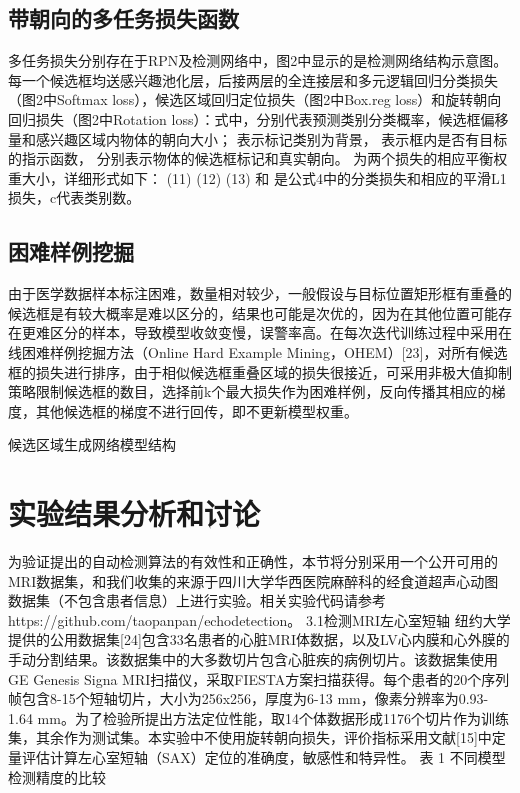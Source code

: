 \subsection{带朝向的多任务损失函数}
多任务损失分别存在于RPN及检测网络中，图2中显示的是检测网络结构示意图。每一个候选框均送感兴趣池化层，后接两层的全连接层和多元逻辑回归分类损失（图2中Softmax loss），候选区域回归定位损失（图2中Box.reg loss）和旋转朝向回归损失（图2中Rotation loss）：式中，分别代表预测类别分类概率，候选框偏移量和感兴趣区域内物体的朝向大小； 表示标记类别为背景， 表示框内是否有目标的指示函数， 分别表示物体的候选框标记和真实朝向。 为两个损失的相应平衡权重大小，详细形式如下：
   	       								      (11)
  									(12)
 								 	(13)
 和 是公式4中的分类损失和相应的平滑L1损失，c代表类别数。
\subsection{困难样例挖掘}
由于医学数据样本标注困难，数量相对较少，一般假设与目标位置矩形框有重叠的候选框是有较大概率是难以区分的，结果也可能是次优的，因为在其他位置可能存在更难区分的样本，导致模型收敛变慢，误警率高。在每次迭代训练过程中采用在线困难样例挖掘方法（Online Hard Example Mining，OHEM）[23]，对所有候选框的损失进行排序，由于相似候选框重叠区域的损失很接近，可采用非极大值抑制策略限制候选框的数目，选择前k个最大损失作为困难样例，反向传播其相应的梯度，其他候选框的梯度不进行回传，即不更新模型权重。 

 
候选区域生成网络模型结构 
 
 
\section{实验结果分析和讨论}
 
为验证提出的自动检测算法的有效性和正确性，本节将分别采用一个公开可用的MRI数据集，和我们收集的来源于四川大学华西医院麻醉科的经食道超声心动图数据集（不包含患者信息）上进行实验。相关实验代码请参考https://github.com/taopanpan/echodetection。
3.1检测MRI左心室短轴
纽约大学提供的公用数据集[24]包含33名患者的心脏MRI体数据，以及LV心内膜和心外膜的手动分割结果。该数据集中的大多数切片包含心脏疾的病例切片。该数据集使用 GE Genesis Signa MRI扫描仪，采取FIESTA方案扫描获得。每个患者的20个序列帧包含8-15个短轴切片，大小为256x256，厚度为6-13 mm，像素分辨率为0.93-1.64 mm。为了检验所提出方法定位性能，取14个体数据形成1176个切片作为训练集，其余作为测试集。本实验中不使用旋转朝向损失，评价指标采用文献[15]中定量评估计算左心室短轴（SAX）定位的准确度，敏感性和特异性。
表 1 不同模型检测精度的比较

